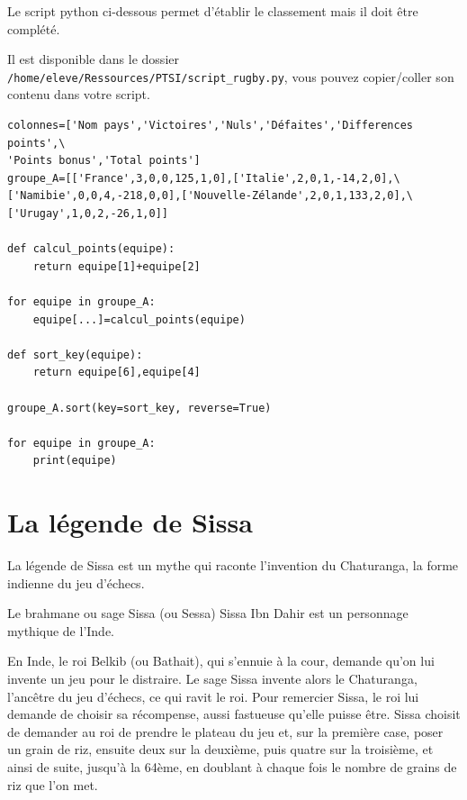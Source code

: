 \vspace{0.5cm}

Le script python ci-dessous permet d'établir le classement mais il doit être complété.

Il est disponible dans le dossier \og \texttt{/home/eleve/Ressources/PTSI/script\_rugby.py}\fg, vous pouvez copier/coller son contenu dans votre script.

\begin{verbatim}
colonnes=['Nom pays','Victoires','Nuls','Défaites','Differences points',\
'Points bonus','Total points']
groupe_A=[['France',3,0,0,125,1,0],['Italie',2,0,1,-14,2,0],\
['Namibie',0,0,4,-218,0,0],['Nouvelle-Zélande',2,0,1,133,2,0],\
['Urugay',1,0,2,-26,1,0]]

def calcul_points(equipe):
    return equipe[1]+equipe[2]

for equipe in groupe_A:
    equipe[...]=calcul_points(equipe)

def sort_key(equipe):
    return equipe[6],equipe[4]

groupe_A.sort(key=sort_key, reverse=True)

for equipe in groupe_A:
    print(equipe)
\end{verbatim}

\newpage



\section{La légende de Sissa}

La légende de Sissa est un mythe qui raconte l'invention du Chaturanga, la forme indienne du jeu d'échecs.

Le brahmane ou sage Sissa (ou Sessa) Sissa Ibn Dahir est un personnage mythique de l'Inde. 

En Inde, le roi Belkib (ou Bathait), qui s'ennuie à la cour, demande qu'on lui invente un jeu pour le distraire. Le sage Sissa invente alors le Chaturanga, l'ancêtre du jeu d'échecs, ce qui ravit le roi. Pour remercier Sissa, le roi lui demande de choisir sa récompense, aussi fastueuse qu'elle puisse être. Sissa choisit de demander au roi de prendre le plateau du jeu et, sur la première case, poser un grain de riz, ensuite deux sur la deuxième, puis quatre sur la troisième, et ainsi de suite, jusqu'à la 64ème, en doublant à chaque fois le nombre de grains de riz que l’on met.


